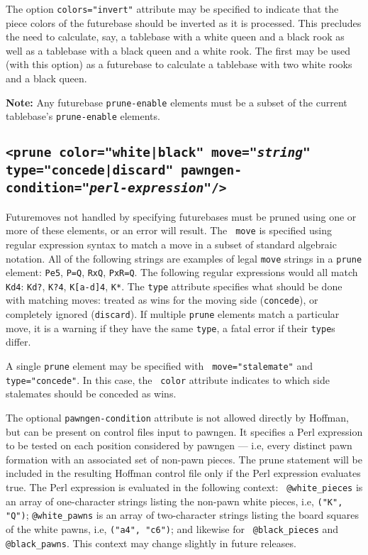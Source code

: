 \documentclass[11pt]{article}
\begin{document}
The option {\tt colors="invert"} attribute may be specified to indicate
that the piece colors of the futurebase should be inverted as it is
processed.  This precludes the need to calculate, say, a tablebase
with a white queen and a black rook as well as a tablebase with a
black queen and a white rook.  The first may be used (with this
option) as a futurebase to calculate a tablebase with two white rooks
and a black queen.

{\bf Note:} Any futurebase {\tt prune-enable} elements must be a subset of
the current tablebase's {\tt prune-enable} elements.

\subsection{\tt <prune color="white|black" move="{\it string}" type="concede|discard" \hfil\break\hbox{\qquad} pawngen-condition="{\it perl-expression}"/>}

Futuremoves not handled by specifying futurebases must be pruned using
one or more of these elements, or an error will result.  The {\tt
  move} is specified using regular expression syntax to match a move
in a subset of standard algebraic notation.  All of the following
strings are examples of legal {\tt move} strings in a {\tt prune}
element: {\tt Pe5}, {\tt P=Q}, {\tt RxQ}, {\tt PxR=Q}.  The following
regular expressions would all match {\tt Kd4}: {\tt Kd?}, {\tt K?4},
{\tt K[a-d]4}, {\tt K*}.  The {\tt type} attribute specifies what
should be done with matching moves: treated as wins for the moving
side ({\tt concede}), or completely ignored ({\tt discard}).  If
multiple {\tt prune} elements match a particular move, it is a warning
if they have the same {\tt type}, a fatal error if their {\tt type}s
differ.

A single {\tt prune} element may be specified with {\tt
move="stalemate"} and {\tt type="concede"}.  In this case, the {\tt
color} attribute indicates to which side stalemates should be conceded
as wins.

The optional {\tt pawngen-condition} attribute is not allowed directly
by Hoffman, but can be present on control files input to pawngen.  It
specifies a Perl expression to be tested on each position considered
by pawngen --- i.e, every distinct pawn formation with an associated
set of non-pawn pieces.  The prune statement will be included in the
resulting Hoffman control file only if the Perl expression evaluates
true.  The Perl expression is evaluated in the following context: {\tt
@white\_pieces} is an array of one-character strings listing the
non-pawn white pieces, i.e, {\tt ("K", "Q")}; {\tt @white\_pawns} is
an array of two-character strings listing the board squares of the
white pawns, i.e, {\tt ("a4", "c6")}; and likewise for {\tt
@black\_pieces} and {\tt @black\_pawns}.  This context may change
slightly in future releases.
\end{document}
